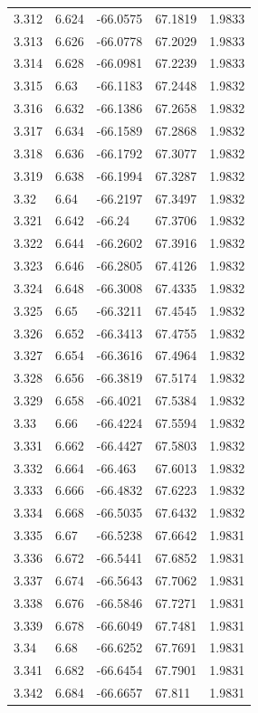 \begin{tabular}{lllll}
3.312 & 6.624 & -66.0575 & 67.1819 & 1.9833 \\
3.313 & 6.626 & -66.0778 & 67.2029 & 1.9833 \\
3.314 & 6.628 & -66.0981 & 67.2239 & 1.9833 \\
3.315 & 6.63 & -66.1183 & 67.2448 & 1.9832 \\
3.316 & 6.632 & -66.1386 & 67.2658 & 1.9832 \\
3.317 & 6.634 & -66.1589 & 67.2868 & 1.9832 \\
3.318 & 6.636 & -66.1792 & 67.3077 & 1.9832 \\
3.319 & 6.638 & -66.1994 & 67.3287 & 1.9832 \\
3.32 & 6.64 & -66.2197 & 67.3497 & 1.9832 \\
3.321 & 6.642 & -66.24 & 67.3706 & 1.9832 \\
3.322 & 6.644 & -66.2602 & 67.3916 & 1.9832 \\
3.323 & 6.646 & -66.2805 & 67.4126 & 1.9832 \\
3.324 & 6.648 & -66.3008 & 67.4335 & 1.9832 \\
3.325 & 6.65 & -66.3211 & 67.4545 & 1.9832 \\
3.326 & 6.652 & -66.3413 & 67.4755 & 1.9832 \\
3.327 & 6.654 & -66.3616 & 67.4964 & 1.9832 \\
3.328 & 6.656 & -66.3819 & 67.5174 & 1.9832 \\
3.329 & 6.658 & -66.4021 & 67.5384 & 1.9832 \\
3.33 & 6.66 & -66.4224 & 67.5594 & 1.9832 \\
3.331 & 6.662 & -66.4427 & 67.5803 & 1.9832 \\
3.332 & 6.664 & -66.463 & 67.6013 & 1.9832 \\
3.333 & 6.666 & -66.4832 & 67.6223 & 1.9832 \\
3.334 & 6.668 & -66.5035 & 67.6432 & 1.9832 \\
3.335 & 6.67 & -66.5238 & 67.6642 & 1.9831 \\
3.336 & 6.672 & -66.5441 & 67.6852 & 1.9831 \\
3.337 & 6.674 & -66.5643 & 67.7062 & 1.9831 \\
3.338 & 6.676 & -66.5846 & 67.7271 & 1.9831 \\
3.339 & 6.678 & -66.6049 & 67.7481 & 1.9831 \\
3.34 & 6.68 & -66.6252 & 67.7691 & 1.9831 \\
3.341 & 6.682 & -66.6454 & 67.7901 & 1.9831 \\
3.342 & 6.684 & -66.6657 & 67.811 & 1.9831 \\

\end{tabular}
